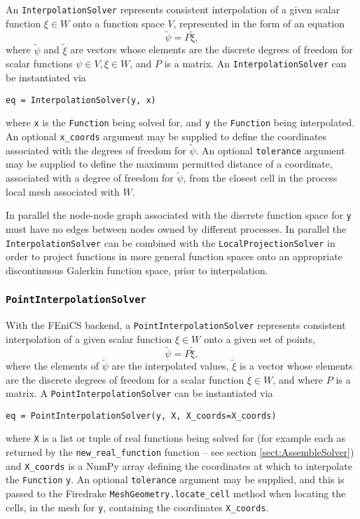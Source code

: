 \documentclass[11pt]{article}
\begin{document}
An \texttt{InterpolationSolver} represents consistent interpolation of a given
scalar function $\xi \in W$ onto a function space $V$, represented in the form
of an equation
\begin{equation*}
  \tilde{\psi} = P \tilde{\xi},
\end{equation*}
where $\tilde{\psi}$ and $\tilde{\xi}$ are vectors whose elements are the
discrete degrees of freedom for scalar functions $\psi \in V, \xi \in W$, and
$P$ is a matrix. An \texttt{InterpolationSolver} can be instantiated via
\begin{lstlisting}
eq = InterpolationSolver(y, x)
\end{lstlisting}
where \texttt{x} is the \texttt{Function} being solved for, and \texttt{y} the
\texttt{Function} being interpolated. An optional \texttt{x\_coords} argument
may be supplied to define the coordinates associated with the degrees of
freedom for $\tilde{\psi}$. An optional \texttt{tolerance} argument may be
supplied to define the maximum permitted distance of a coordinate, associated
with a degree of freedom for $\tilde{\psi}$, from the closest cell in the
process local mesh associated with $W$.

In parallel the node-node graph associated with the discrete function space for
\texttt{y} must have no edges between nodes owned by different processes. In
parallel the \texttt{InterpolationSolver} can be combined with the
\texttt{LocalProjectionSolver} in order to project functions in more general
function spaces onto an appropriate discontinuous Galerkin function space,
prior to interpolation.

\subsubsection{\texttt{PointInterpolationSolver}}

With the FEniCS backend, a \texttt{PointInterpolationSolver} represents
consistent interpolation of a given scalar function $\xi \in W$ onto a given
set of points,
\begin{equation*}
  \tilde{\psi} = P \tilde{\xi},
\end{equation*}
where the elements of $\tilde{\psi}$ are the interpolated values, $\tilde{\xi}$
is a vector whose elements are the discrete degrees of freedom for a scalar
function $\xi \in W$, and where $P$ is a matrix. A
\texttt{PointInterpolationSolver} can be instantiated via
\begin{lstlisting}
eq = PointInterpolationSolver(y, X, X_coords=X_coords)
\end{lstlisting}
where \texttt{X} is a list or tuple of real functions being solved for (for
example each as returned by the \texttt{new\_real\_function} function -- see
section \ref{sect:AssembleSolver}) and \texttt{X\_coords} is a NumPy array
defining the coordinates at which to interpolate the \texttt{Function}
\texttt{y}. An optional \texttt{tolerance} argument may be supplied, and this
is passed to the Firedrake \texttt{MeshGeometry.locate\_cell} method when
locating the cells, in the mesh for \texttt{y}, containing the coordinates
\texttt{X\_coords}.
\end{document}
